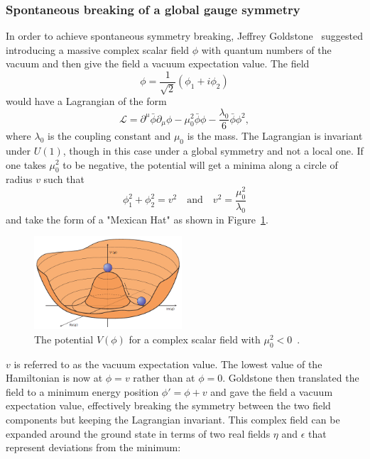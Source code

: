 \subsubsection{Spontaneous breaking of a global gauge symmetry}
In order to achieve spontaneous symmetry breaking, Jeffrey Goldstone~\cite{Goldstone:1961eq} suggested introducing a massive complex scalar field $\phi$ with quantum numbers of the vacuum and then give the field a vacuum expectation value. The field
\begin{equation}
\phi = \frac{1}{\sqrt{2}}(\phi_1+i\phi_2)  
\end{equation}
would have a Lagrangian of the form
\begin{equation}
\mathcal{L} = \partial^{\mu}\bar{\phi}\partial_{\mu}\phi-\mu_0^2\bar{\phi}\phi-\frac{\lambda_0}{6}\bar{\phi}\phi^2,
\end{equation}
where $\lambda_0$ is the coupling constant and $\mu_0$ is the mass. The Lagrangian is invariant under $U(1)$, though in this case under a global symmetry and not a local one. If one takes $\mu_0^2$ to be negative, the potential will get a minima along a circle of radius $v$ such that
\begin{equation}
  \phi_1^2+\phi_2^2 = v^2 \quad \textrm{and}\quad v^2=\frac{\mu_0^2}{\lambda_0}
\end{equation}
and take the form of a "Mexican Hat" as shown in Figure~\ref{fig:theory:higgspot}. 
  \begin{figure}[h!]
  \centering
  \includegraphics[width=0.49\textwidth]{figures/theory/higgspotential.png}
  \caption{The potential $V(\phi)$ for a complex scalar field with $\mu_0^2<0$~\cite{Ellis:1638469}.}
  \label{fig:theory:higgspot}
  \end{figure}
$v$ is referred to as the vacuum expectation value. The lowest value of the Hamiltonian is now at $\phi=v$ rather than at $\phi=0$. Goldstone then translated the field to a minimum energy position $\phi'=\phi+v$ and gave the field a vacuum expectation value, effectively breaking the symmetry between the two field components but keeping the Lagrangian invariant.
This complex field can be expanded around the ground state in terms of two real fields $\eta$ and $\epsilon$ that represent deviations from the minimum:
